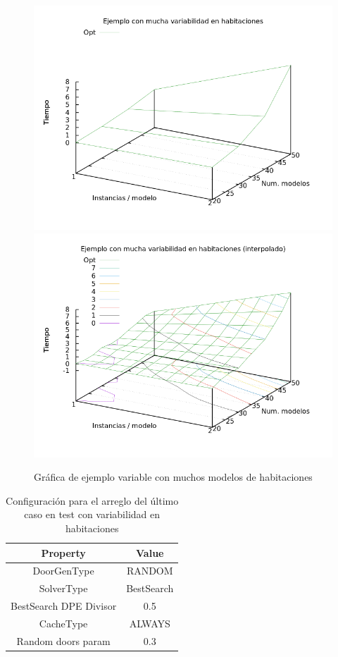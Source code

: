\begin{figure}[H]
\centering
\includegraphics[scale=0.5]{img/opt-var}
\includegraphics[scale=0.5]{img/opt-var-spl}
\caption{Gráfica de ejemplo variable con muchos modelos de habitaciones
\label{fig:grfoptvar}}
\end{figure}





\begin{table}[H]
\begin{center}
	\begin{tabular}{ | c | c | }
\hline
 		Property & Value \\ \hline
DoorGenType & RANDOM \\ 
SolverType & BestSearch \\ 
BestSearch DPE Divisor & 0.5 \\ 
CacheType & ALWAYS \\ 
Random doors param & 0.3 \\ 
\hline
	\end{tabular}
\end{center}
\caption{Configuración para el arreglo del último caso en test con variabilidad en habitaciones}
\label{table:cfg-optvarfix}
\end{table}



